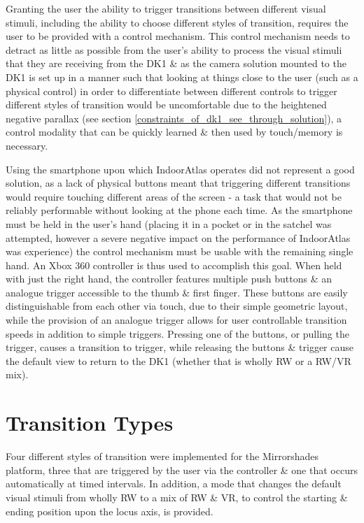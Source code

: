 Granting the user the ability to trigger transitions between different visual stimuli, including the ability to choose different styles of transition, requires the user to be provided with a control mechanism. This control mechanism needs to detract as little as possible from the user's ability to process the visual stimuli that they are receiving from the DK1 \& as the camera solution mounted to the DK1 is set up in a manner such that looking at things close to the user (such as a physical control) in order to differentiate between different controls to trigger different styles of transition would be uncomfortable due to the heightened negative parallax (see section \ref{constraints_of_dk1_see_through_solution}), a control modality that can be quickly learned \& then used by touch/memory is necessary.

Using the smartphone upon which IndoorAtlas operates did not represent a good solution, as a lack of physical buttons meant that triggering different transitions would require touching different areas of the screen - a task that would not be reliably performable without looking at the phone each time. As the smartphone must be held in the user's hand (placing it in a pocket or in the satchel was attempted, however a severe negative impact on the performance of IndoorAtlas was experience) the control mechanism must be usable with the remaining single hand. An Xbox 360 controller is thus used to accomplish this goal. When held with just the right hand, the controller features multiple push buttons \& an analogue trigger accessible to the thumb \& first finger. These buttons are easily distinguishable from each other via touch, due to their simple geometric layout, while the provision of an analogue trigger allows for user controllable transition speeds in addition to simple triggers. Pressing one of the buttons, or pulling the trigger, causes a transition to trigger, while releasing the buttons \& trigger cause the default view to return to the DK1 (whether that is wholly RW or a RW/VR mix).


\section{Transition Types}

Four different styles of transition were implemented for the Mirrorshades platform, three that are triggered by the user via the controller \& one that occurs automatically at timed intervals. In addition, a mode that changes the default visual stimuli from wholly RW to a mix of RW \& VR, to control the starting \& ending position upon the locus axis, is provided.


